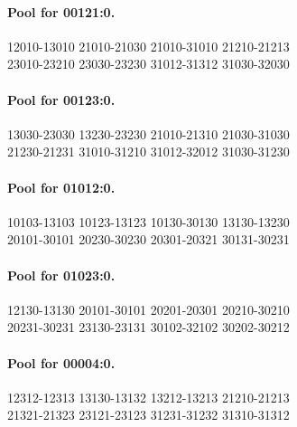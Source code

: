 \documentclass[11pt]{article}
\numberwithin{equation}{section}
\numberwithin{table}{section}
\begin{document}
\paragraph{Pool for 00121:0.}
\begingroup\footnotesize\ttfamily\begin{flushleft}
12010-13010 21010-21030 21010-31010 21210-21213\\
23010-23210 23030-23230 31012-31312 31030-32030\\
\end{flushleft}\endgroup
\paragraph{Pool for 00123:0.}
\begingroup\footnotesize\ttfamily\begin{flushleft}
13030-23030 13230-23230 21010-21310 21030-31030\\
21230-21231 31010-31210 31012-32012 31030-31230\\
\end{flushleft}\endgroup
\paragraph{Pool for 01012:0.}
\begingroup\footnotesize\ttfamily\begin{flushleft}
10103-13103 10123-13123 10130-30130 13130-13230\\
20101-30101 20230-30230 20301-20321 30131-30231\\
\end{flushleft}\endgroup
\paragraph{Pool for 01023:0.}
\begingroup\footnotesize\ttfamily\begin{flushleft}
12130-13130 20101-30101 20201-20301 20210-30210\\
20231-30231 23130-23131 30102-32102 30202-30212\\
\end{flushleft}\endgroup
\paragraph{Pool for 00004:0.}
\begingroup\footnotesize\ttfamily\begin{flushleft}
12312-12313 13130-13132 13212-13213 21210-21213\\
21321-21323 23121-23123 31231-31232 31310-31312\\
\end{flushleft}\endgroup
\end{document}

